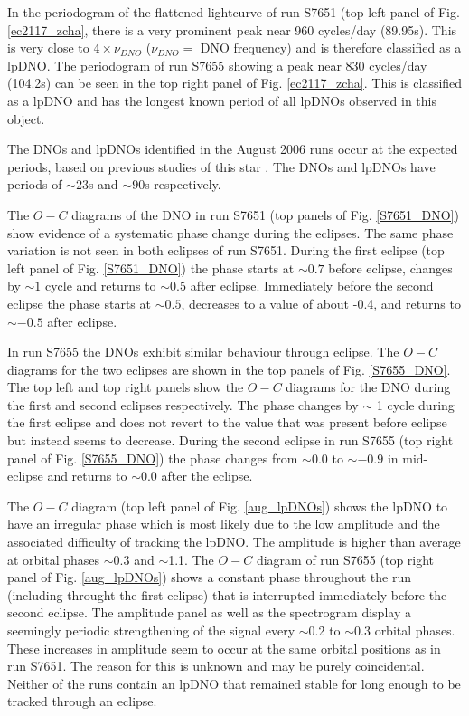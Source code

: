 




In the periodogram of the flattened lightcurve of run S7651 (top left panel of Fig. \ref{ec2117_zcha}, there is a very prominent peak near 960 cycles/day (89.95s). This is very close to $4\times\nu_{DNO}$ ($\nu_{DNO}= $ DNO frequency) and is therefore classified as a lpDNO. The periodogram of run S7655 showing a peak near 830 cycles/day (104.2s) can be seen in the top right panel of Fig. \ref{ec2117_zcha}. This is classified as a lpDNO and has the longest known period of all lpDNOs observed in this object. 

The DNOs and lpDNOs identified in the August 2006 runs occur at the expected periods, based on previous studies of this star \citep{WWP}. The DNOs and lpDNOs have periods of $\sim23$s and $\sim90$s respectively.



The $O-C$ diagrams of the DNO in run S7651 (top panels of Fig. \ref{S7651_DNO}) show evidence of a systematic phase change during the eclipses. The same phase variation is not seen in both eclipses of run S7651. During the first eclipse (top left panel of Fig. \ref{S7651_DNO}) the phase starts at $\sim0.7$ before eclipse, changes by $\sim1$ cycle and returns to $\sim0.5$ after eclipse. Immediately before the second eclipse the phase starts at $\sim0.5$, decreases to a value of about -0.4, and returns to $\sim-0.5$ after eclipse.

In run S7655 the DNOs exhibit similar behaviour through eclipse. The $O-C$ diagrams for the two eclipses are shown in the top panels of Fig. \ref{S7655_DNO}. The top left and top right panels show the $O-C$ diagrams for the DNO during the first and second eclipses respectively. The phase changes by $\sim$ 1 cycle during the first eclipse and does not revert to the value that was present before eclipse but instead seems to decrease. During the second eclipse in run S7655 (top right panel of Fig. \ref{S7655_DNO}) the phase changes from $\sim0.0$ to $\sim-0.9$ in mid-eclipse and returns to $\sim0.0$ after the eclipse.



The $O-C$ diagram (top left panel of Fig. \ref{aug_lpDNOs}) shows the lpDNO to have an irregular phase which is most likely due to the low amplitude and the associated difficulty of tracking the lpDNO. The amplitude is higher than average at orbital phases $\sim$0.3 and $\sim$1.1. The $O-C$ diagram of run S7655 (top right panel of Fig. \ref{aug_lpDNOs}) shows a constant phase throughout the run (including throught the first eclipse) that is interrupted immediately before the second eclipse. The amplitude panel as well as the spectrogram display a seemingly periodic strengthening of the signal every $\sim$0.2 to $\sim$0.3 orbital phases. These increases in amplitude seem to occur at the same orbital positions as in run S7651. The reason for this is unknown and may be purely coincidental. Neither of the runs contain an lpDNO that remained stable for long enough to be tracked through an eclipse.




